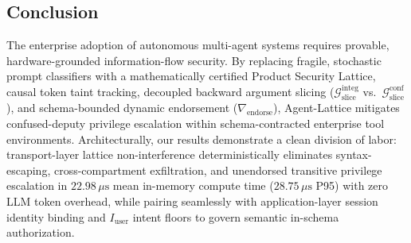 \documentclass[conference,10pt]{IEEEtran}
\begin{document}
\subsection{Conclusion}
The enterprise adoption of autonomous multi-agent systems requires provable, hardware-grounded information-flow security. By replacing fragile, stochastic prompt classifiers with a mathematically certified Product Security Lattice, causal token taint tracking, decoupled backward argument slicing ($\mathcal{G}_{\text{slice}}^{\text{integ}}$ vs.\ $\mathcal{G}_{\text{slice}}^{\text{conf}}$), and schema-bounded dynamic endorsement ($\nabla_{\text{endorse}}$), Agent-Lattice mitigates confused-deputy privilege escalation within schema-contracted enterprise tool environments. Architecturally, our results demonstrate a clean division of labor: transport-layer lattice non-interference deterministically eliminates syntax-escaping, cross-compartment exfiltration, and unendorsed transitive privilege escalation in $22.98\,\mu\text{s}$ mean in-memory compute time ($28.75\,\mu\text{s}$ P95) with zero LLM token overhead, while pairing seamlessly with application-layer session identity binding and $I_{\text{user}}$ intent floors to govern semantic in-schema authorization.
\end{document}
